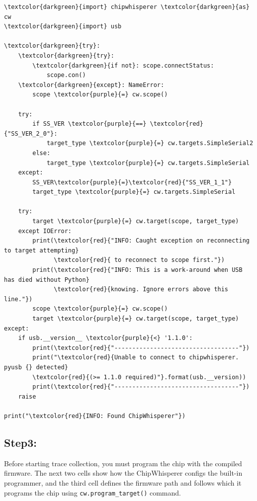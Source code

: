 \documentclass[11pt]{article}
\begin{document}
\begin{small} 
\begin{tcolorbox}
\begin{Verbatim}[commandchars=\\\{\}]
\textcolor{darkgreen}{import} chipwhisperer \textcolor{darkgreen}{as} cw
\textcolor{darkgreen}{import} usb

\textcolor{darkgreen}{try}:
    \textcolor{darkgreen}{try}:
        \textcolor{darkgreen}{if not}: scope.connectStatus:
            scope.con()
    \textcolor{darkgreen}{except}: NameError:
        scope \textcolor{purple}{=} cw.scope()

    try:
        if SS_VER \textcolor{purple}{==} \textcolor{red}{"SS_VER_2_0"}:
            target_type \textcolor{purple}{=} cw.targets.SimpleSerial2
        else:
            target_type \textcolor{purple}{=} cw.targets.SimpleSerial
    except:
        SS_VER\textcolor{purple}{=}\textcolor{red}{"SS_VER_1_1"}
        target_type \textcolor{purple}{=} cw.targets.SimpleSerial

    try:
        target \textcolor{purple}{=} cw.target(scope, target_type)
    except IOError:
        print(\textcolor{red}{"INFO: Caught exception on reconnecting to target attempting} 
              \textcolor{red}{ to reconnect to scope first."})
        print(\textcolor{red}{"INFO: This is a work-around when USB has died without Python} 
              \textcolor{red}{knowing. Ignore errors above this line."})
        scope \textcolor{purple}{=} cw.scope()
        target \textcolor{purple}{=} cw.target(scope, target_type)
except:
    if usb.__version__ \textcolor{purple}{<} '1.1.0':
        print(\textcolor{red}{"-----------------------------------"})
        print("\textcolor{red}{Unable to connect to chipwhisperer. pyusb {} detected}
        \textcolor{red}{(>= 1.1.0 required)"}.format(usb.__version))
        print(\textcolor{red}{"-----------------------------------"})
    raise

print("\textcolor{red}{INFO: Found ChipWhisperer"})

\end{Verbatim}
\end{tcolorbox}
\end{small} 

\subsection{Step3:}
Before starting trace collection, you must program the chip with the compiled firmware.  
The next two cells show how the ChipWhisperer configs the built-in programmer, and the third cell defines the firmware path and follows which it programs the chip using \texttt{cw.program\_target()} command. 
\end{document}
